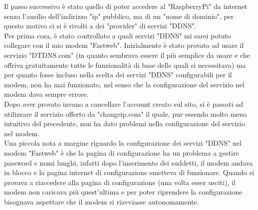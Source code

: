 Il passo successivo è stato quello di poter accedere al "RaspberryPi"  da internet senza l'ausilio dell'indirizzo "ip" pubblico, ma di un "nome di dominio", per questo motivo ci si è rivolti a dei "provider" di servizi "DDNS".\\
Per prima cosa, è stato controllato a quali servizi "DDNS" mi sarei potuto collegare con il mio modem "Fastweb". Inizialmente è stato provato ad usare il servizio "DTDNS.com" (in quanto sembrava essere il più semplice da usare e che offriva gratuitamente tutte le funzionalità di base delle quali si necessitava) ma per quanto fosse incluso nella scelta dei servizi "DDNS" configurabili per il modem, non ha mai funzionato, nel senso che la configurazione del servizio nel modem dava sempre errore.\\
Dopo aver provato invano a cancellare l'account creato sul sito, si è passati ad utilizzare il servizio offerto da "changeip.com" il quale, pur essendo molto meno intuitivo del precedente, non ha dato problemi nella configurazione del servizio nel modem.\\
Una piccola nota a margine riguardo la configurazione dei servizi "DDNS" nel modem "Fastweb" è che la pagina di configurazione ha un  problema a gestire password e nomi lunghi, infatti dopo l'inserimento dei suddetti, il modem andava in blocco e la pagina internet di configurazione smetteva di funzionare. Quando si provava a riaccedere alla pagina di configurazione (una volta esser usciti), il modem non caricava più quest'ultima e per poter riprendere la configurazione bisognava aspettare che il modem si riavviasse autonomamente.\\



